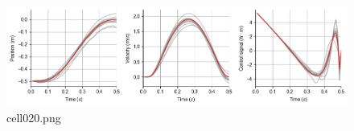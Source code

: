 \begin{figure}[ht]
	\centering
	\includegraphics[scale=0.8, max width=\linewidth]{./fig/motor-learning/optimal-feedback-control/cell020.png}
	\caption{cell020.png}
	\label{cell020.png}
\end{figure}